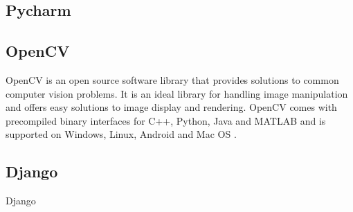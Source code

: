 \subsection{Pycharm}


\subsection{OpenCV}
OpenCV is an open source software library that provides solutions to common computer vision problems. It is an ideal library for handling image manipulation and offers easy solutions to image display and rendering. OpenCV comes with precompiled binary interfaces for C++, Python, Java and MATLAB and is supported on Windows, Linux, Android and Mac OS \cite{open_cv_binaries}.

\subsection{Django}
Django 